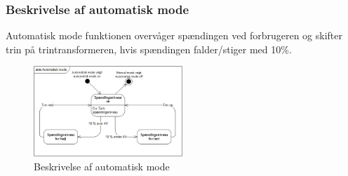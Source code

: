 \subsubsection{Beskrivelse af automatisk mode}
Automatisk mode funktionen overvåger spændingen ved forbrugeren og skifter trin på trintransformeren, hvis spændingen falder/stiger med 10\%. 
\begin{figure}[H] %
	\centering
	\includegraphics[width=0.5\textwidth]{figure/STM}
	\caption{Beskrivelse af automatisk mode}
	\label{fig:autoSTM}
\end{figure}
